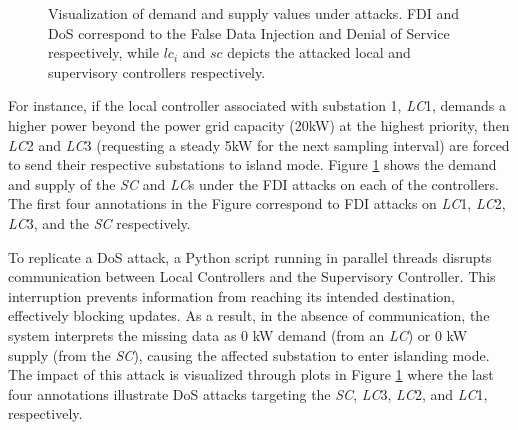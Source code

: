 \begin{figure}[!ht]
    \caption{Visualization of demand and supply values under attacks. FDI and DoS correspond to the False Data Injection and Denial of Service respectively, while $lc_i$ and $sc$ depicts  the attacked local and supervisory controllers respectively. }
    \label{fig:grid_attack}
\end{figure}
  For instance, if the local controller associated with substation 1, \textit{LC}1, demands a higher power beyond the power grid capacity (20kW) at the highest priority, then \textit{LC}2 and \textit{LC}3 (requesting a steady 5kW for the next sampling interval) are forced to send their respective substations to island mode. Figure \ref{fig:grid_attack} shows the demand and supply of the \textit{SC} and \textit{LC}s under the FDI attacks on each of the controllers. 
  The first four annotations in the Figure correspond to FDI attacks on \textit{LC}1, \textit{LC}2, \textit{LC}3, and the \textit{SC} respectively. 

To replicate a DoS attack, a Python script running in parallel threads disrupts communication between Local Controllers and the Supervisory Controller. This interruption prevents information from reaching its intended destination, effectively blocking updates. As a result, in the absence of communication, the system interprets the missing data as 0 kW demand (from an \textit{LC}) or 0 kW supply (from the \textit{SC}), causing the affected substation to enter islanding mode. The impact of this attack is visualized through plots in Figure \ref{fig:grid_attack} where
the last four annotations illustrate DoS attacks targeting the \textit{SC}, \textit{LC}3, \textit{LC}2, and \textit{LC}1, respectively. 

